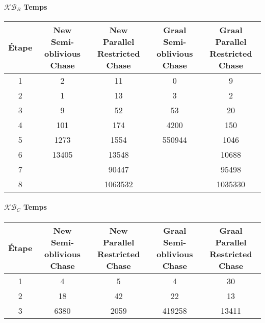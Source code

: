 \paragraph{$\mathcal{KB}_B$ Temps}
\begin{center}
\begin{tabular}{|c||c|c|c|c|}
    \hline
    Étape & \shortstack{New \\ Semi-oblivious Chase} & \shortstack{New \\ Parallel Restricted Chase} & \shortstack{Graal \\ Semi-oblivious Chase} & \shortstack{Graal \\ Parallel Restricted Chase} \\
    \hline
     \hline
1&2&	11&					0&	9\\
     \hline
2&1&	13&					3&	2\\
     \hline
3&9&	52&					53&	20\\
     \hline
4&101&	174&					4200&	150\\
     \hline
5&1273&	1554&					550944&	1046\\
     \hline
6&13405&	13548&			&			10688\\
     \hline
7&	&90447	&			&		95498\\
     \hline
8&	&1063532&			&			1035330\\
     \hline
\end{tabular}
\end{center}

\paragraph{$\mathcal{KB}_C$ Temps}
\begin{center}
\begin{tabular}{|c||c|c|c|c|}
    \hline
    Étape & \shortstack{New \\ Semi-oblivious Chase} & \shortstack{New \\ Parallel Restricted Chase} & \shortstack{Graal \\ Semi-oblivious Chase} & \shortstack{Graal \\ Parallel Restricted Chase} \\
    \hline
     \hline
1&4&	5&					4&	30 \\
     \hline
2&18&	42&					22&	13 \\
     \hline
3&6380&	2059&					419258&	13411 \\
     \hline
\end{tabular}
\end{center}

